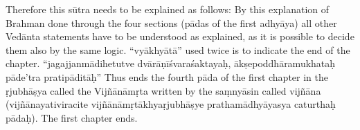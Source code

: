Therefore this sūtra needs to be explained as follows: By this explanation of Brahman done through the four sections (pādas of the first adhyāya) all other Vedānta statements have to be understood as   explained, as it is possible to decide them also by the same logic. “vyā\-khyātā” used twice is to indicate the end of the chapter. “jagajjanmādihetutve dvārāṇīśvaraśaktayaḥ, ākṣepoddhāramukhataḥ pāde’tra pratipāditāḥ” Thus ends the fourth pāda of the first chapter in the ṛjubhāṣya called the Vijñānāmṛta written by the saṃnyāsin called vijñāna (vijñānayativiracite vijñānāmṛtākhyaṛjubhāṣye prathamādhyā\-yasya caturthaḥ pādaḥ). The first chapter ends.
